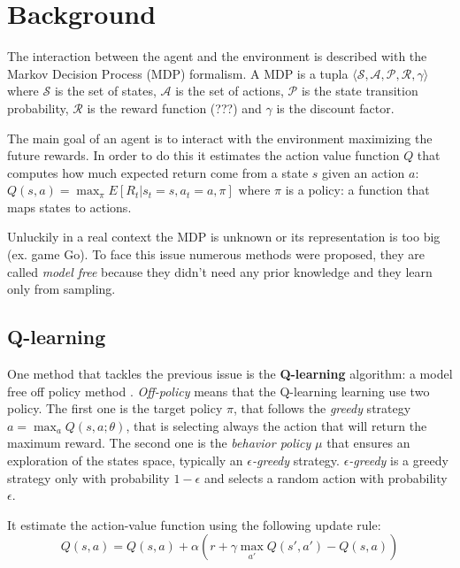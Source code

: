 \section{Background}


The interaction between the agent and the environment is described  with the
Markov Decision Process (MDP) formalism. A MDP is a tupla $\langle \mathcal{S}, 
\mathcal{A}, \mathcal{P}, \mathcal{R}, \gamma \rangle$ where $\mathcal{S}$ is
the set of states, $\mathcal{A}$ is the set of actions, $\mathcal{P}$ is the 
state transition probability, $\mathcal{R}$ is the reward function (???) and 
$\gamma$ is the discount factor.

The main goal of an agent is to interact with the environment maximizing the future rewards. In order to do this it estimates the action value function $Q$ that computes how much expected return come from a state $s$ given an action $a$: $Q(s, a) = \max_\pi E[R_t | s_t = s, a_t = a, \pi]$ where $\pi$ is a policy: a function that maps states to actions.


Unluckily in a real context the MDP is unknown or its representation is too big
(ex. game Go). To face this issue numerous methods were proposed, they are 
called \textit{model free} because they didn't need any prior knowledge and they learn only from sampling.


\subsection{Q-learning}

One method that tackles the previous issue is the \textbf{Q-learning} algorithm: a model free off policy method \cite{Watkins1992}. 
\textit{Off-policy} means that the Q-learning learning use two policy. The first one is the target policy $\pi$, that follows the \textit{greedy} strategy $a = \max_a Q(s, a; \theta)$, that is selecting always the action that will return the maximum reward.
The second one is the \textit{behavior policy} $\mu$ that ensures an exploration of the states space, typically an \textit{$\epsilon$-greedy} strategy. \textit{$\epsilon$-greedy} is a greedy strategy only with probability $1 - \epsilon$ and selects a random action with probability $\epsilon$.

It estimate the action-value function using the following update rule:
\begin{equation}
	Q(s,a) = Q(s, a) + \alpha (r + \gamma \max_{a'} Q(s', a') - Q(s, a))
\end{equation}

